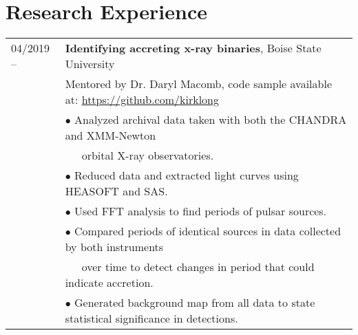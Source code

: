 \documentclass[11pt]{article}
\begin{document}
\section{Research Experience}
\begin{tabular}{ll}
04/2019 --		& 	\textbf{Identifying accreting x-ray binaries}, Boise State University \vspace{1mm} \\
			&	Mentored by Dr. Daryl Macomb, code sample available at: \url{https://github.com/kirklong}\\
      & $\bullet$ Analyzed archival data taken with both the CHANDRA and XMM-Newton \\
      &  \-\ \-\ \-\ orbital X-ray observatories.\\
      & $\bullet$ Reduced data and extracted light curves using HEASOFT and SAS.\\
      & $\bullet$ Used FFT analysis to find periods of pulsar sources.\\
      & $\bullet$ Compared periods of identical sources in data collected by both instruments \\
      & \-\ \-\ \-\ over time to detect changes in period that could indicate accretion.\\
      & $\bullet$ Generated background map from all data to state statistical significance in detections.\\

\end{tabular}
\end{document}
